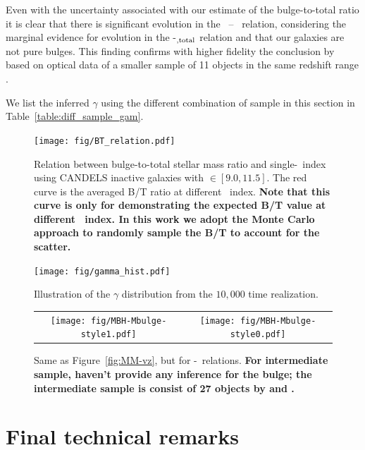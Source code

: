 \documentclass[apj]{emulateapj}
\begin{document}
Even with the uncertainty associated with our estimate of the
bulge-to-total ratio it is clear that there is significant evolution
in the \mbh\ -- \bmass\ relation, considering the
marginal evidence for evolution in the \mbh-\smass$_{\rm, total}$
relation and that our galaxies are not pure bulges. This finding
confirms with higher fidelity the conclusion by \citet{Bennert11}
based on optical data of a smaller sample of 11 objects in the same
redshift range \citep[see][for similar results]{SS13, Jah++09, Cisternas2011}.

We list the inferred $\gamma$ using the different combination of sample in this section in
Table~\ref{table:diff_sample_gam}.

\begin{figure}
\centering
{
\texttt{[image: fig/BT\_relation.pdf]}
}
\caption{\label{fig:BT-n_relation} 
Relation between bulge-to-total stellar mass ratio and single-\sersic\ index using CANDELS inactive galaxies with \smass$\in [9.0, 11.5]$. The red curve is the averaged B/T ratio at different \sersic\ index. {\bf Note that this curve is only for demonstrating the expected B/T value at different \sersic\ index. In this work we adopt the Monte Carlo approach to randomly sample the B/T to account for the scatter.}
}
\end{figure} 

\begin{figure}
\centering
{
\texttt{[image: fig/gamma\_hist.pdf]}
}
\caption{\label{fig:gamma_hist} 
Illustration of the $\gamma$ distribution from the $10,000$ time realization.
}
\end{figure} 

\begin{figure}
\centering
\begin{tabular}{c c}
{\texttt{[image: fig/MBH-Mbulge-style1.pdf]}}&
{\texttt{[image: fig/MBH-Mbulge-style0.pdf]}}\\
\end{tabular}
\caption{\label{fig:MM_bulge-vz}
Same as Figure~\ref{fig:MM-vz}, but for \mbh-\bmass\ relations. {\bf For intermediate sample, \citet{Cisternas2011} haven't provide any inference for the bulge; the intermediate sample is consist of 27 objects by \citet{Bennert11} and \citet{SS13}.}}
\end{figure} 


\section{Final technical remarks}
\label{sec:dis}
\end{document}
